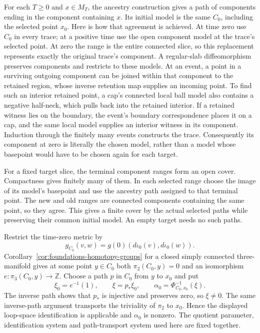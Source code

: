 For each $T\geq0$ and $x\in M_T$, the ancestry construction gives a path
of components ending in the component containing $x$.  Its initial model
is the same $C_0$, including the selected point $x_0$.  Here is how that
agreement is achieved.  At time zero use $C_0$ in every trace; at a positive
time use the open component model at the trace's selected point.  At zero
the range is the entire connected slice, so this replacement represents
exactly the original trace's component.  A regular-slab diffeomorphism
preserves components and restricts to these models.  At an event, a point
in a surviving outgoing component can be joined within that component to
the retained region, whose inverse retention map supplies an incoming
point.  To find such an interior retained point, a cap's connected local
ball model also contains a negative half-neck, which pulls back into the
retained interior.  If a retained witness lies on the boundary, the
event's boundary correspondence places it on a cap, and the same local
model supplies an interior witness in its component.  Induction through
the finitely many events constructs the trace.
Consequently its component at zero is literally the chosen model, rather
than a model whose basepoint would have to be chosen again for each target.

For a fixed target slice, the terminal component ranges form an open cover.
Compactness gives finitely many of them.  In each selected range choose
the image of its model's basepoint and use the ancestry path assigned to
that terminal point.  The new and old ranges are connected components
containing the same point, so they agree.  This gives a finite cover by
the actual selected paths while preserving their common initial model.
An empty target needs no such paths.

Restrict the time-zero metric by
\[
 g_{C_0}(v,w)=g(0)(d\iota_0(v),d\iota_0(w)).
\]
Corollary~\ref{cor:foundations-homotopy-groups} for a closed simply
connected three-manifold gives
at some point $y\in C_0$ both $\pi_2(C_0,y)=0$ and an isomorphism
$e:\pi_3(C_0,y)\to\mathbb Z$.  Choose a path $p$ in $C_0$ from $y$ to
$x_0$ and put
\[
 \xi_0=e^{-1}(1),\qquad
 \xi=p_*\xi_0,\qquad
 \alpha_0=\Phi_{C_0,x_0}^{-1}(\xi).
\]
The inverse path shows that $p_*$ is injective and preserves zero, so
$\xi\ne0$.  The same inverse-path argument transports the triviality of
$\pi_2$ to $x_0$.  Hence the displayed loop-space identification is
applicable and $\alpha_0$ is nonzero.  The quotient parameter, identification
system and path-transport system used here are fixed together.

